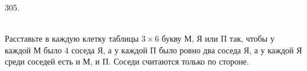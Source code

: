 305. \begin{figure}[ht!]
\end{figure}\\
Расставьте в каждую клетку таблицы $3\times6$ букву М, Я или П так, чтобы у каждой М было 4 соседа Я, а у каждой П было ровно два соседа Я, а у каждой Я среди соседей есть и М, и П. Соседи считаются только по стороне.\\

